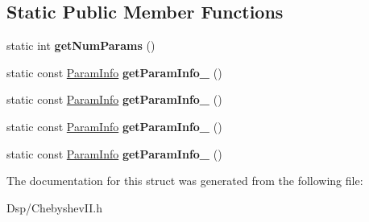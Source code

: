 \subsection*{Static Public Member Functions}
\begin{DoxyCompactItemize}
\item 
\hypertarget{structDsp_1_1ChebyshevII_1_1Design_1_1TypeIVBase_ab0d65f4a2886f00c6aab3d1c9fec4363}{static int {\bfseries get\-Num\-Params} ()}\label{structDsp_1_1ChebyshevII_1_1Design_1_1TypeIVBase_ab0d65f4a2886f00c6aab3d1c9fec4363}

\item 
\hypertarget{structDsp_1_1ChebyshevII_1_1Design_1_1TypeIVBase_afd6fc428521f4ae96d0d28166f79b619}{static const \hyperlink{classDsp_1_1ParamInfo}{Param\-Info} {\bfseries get\-Param\-Info\-\_} ()}\label{structDsp_1_1ChebyshevII_1_1Design_1_1TypeIVBase_afd6fc428521f4ae96d0d28166f79b619}

\item 
\hypertarget{structDsp_1_1ChebyshevII_1_1Design_1_1TypeIVBase_a86a5587b5d0488b149bd0173987acb04}{static const \hyperlink{classDsp_1_1ParamInfo}{Param\-Info} {\bfseries get\-Param\-Info\-\_} ()}\label{structDsp_1_1ChebyshevII_1_1Design_1_1TypeIVBase_a86a5587b5d0488b149bd0173987acb04}

\item 
\hypertarget{structDsp_1_1ChebyshevII_1_1Design_1_1TypeIVBase_a763cd102d8c5dac1b8d347c87d26f37c}{static const \hyperlink{classDsp_1_1ParamInfo}{Param\-Info} {\bfseries get\-Param\-Info\-\_} ()}\label{structDsp_1_1ChebyshevII_1_1Design_1_1TypeIVBase_a763cd102d8c5dac1b8d347c87d26f37c}

\item 
\hypertarget{structDsp_1_1ChebyshevII_1_1Design_1_1TypeIVBase_a7d8531b82b3d46332a32d0f7ed2b3178}{static const \hyperlink{classDsp_1_1ParamInfo}{Param\-Info} {\bfseries get\-Param\-Info\-\_} ()}\label{structDsp_1_1ChebyshevII_1_1Design_1_1TypeIVBase_a7d8531b82b3d46332a32d0f7ed2b3178}

\end{DoxyCompactItemize}


The documentation for this struct was generated from the following file\-:\begin{DoxyCompactItemize}
\item 
Dsp/Chebyshev\-I\-I.\-h\end{DoxyCompactItemize}
